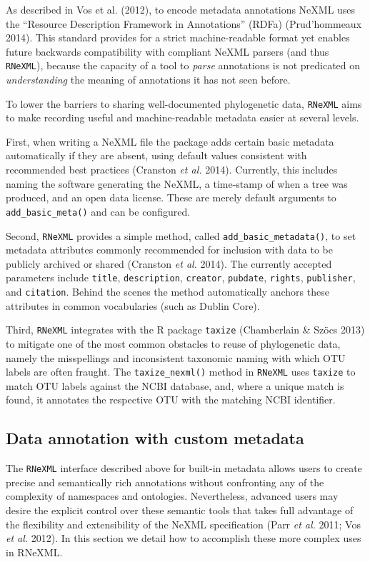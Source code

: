 \documentclass[author-year, review, 11pt]{elsarticle} %
\begin{document}
As described in Vos et al. (2012), to encode metadata annotations NeXML
uses the ``Resource Description Framework in Annotations'' (RDFa)
(Prud'hommeaux 2014). This standard provides for a strict
machine-readable format yet enables future backwards compatibility with
compliant NeXML parsers (and thus \texttt{RNeXML}), because the capacity
of a tool to \emph{parse} annotations is not predicated on
\emph{understanding} the meaning of annotations it has not seen before.

To lower the barriers to sharing well-documented phylogenetic data,
\texttt{RNeXML} aims to make recording useful and machine-readable
metadata easier at several levels.

First, when writing a NeXML file the package adds certain basic metadata
automatically if they are absent, using default values consistent with
recommended best practices (Cranston \emph{et al.} 2014). Currently,
this includes naming the software generating the NeXML, a time-stamp of
when a tree was produced, and an open data license. These are merely
default arguments to \texttt{add\_basic\_meta()} and can be configured.

Second, \texttt{RNeXML} provides a simple method, called
\texttt{add\_basic\_metadata()}, to set metadata attributes commonly
recommended for inclusion with data to be publicly archived or shared
(Cranston \emph{et al.} 2014). The currently accepted parameters include
\texttt{title}, \texttt{description}, \texttt{creator},
\texttt{pubdate}, \texttt{rights}, \texttt{publisher}, and
\texttt{citation}. Behind the scenes the method automatically anchors
these attributes in common vocabularies (such as Dublin Core).

Third, \texttt{RNeXML} integrates with the R package \texttt{taxize}
(Chamberlain \& Sz{ö}cs 2013) to mitigate one of the most common
obstacles to reuse of phylogenetic data, namely the misspellings and
inconsistent taxonomic naming with which OTU labels are often fraught.
The \texttt{taxize\_nexml()} method in \texttt{RNeXML} uses
\texttt{taxize} to match OTU labels against the NCBI database, and,
where a unique match is found, it annotates the respective OTU with the
matching NCBI identifier.

\subsection{Data annotation with custom
metadata}\label{data-annotation-with-custom-metadata}

The \texttt{RNeXML} interface described above for built-in metadata
allows users to create precise and semantically rich annotations without
confronting any of the complexity of namespaces and ontologies.
Nevertheless, advanced users may desire the explicit control over these
semantic tools that takes full advantage of the flexibility and
extensibility of the NeXML specification (Parr \emph{et al.} 2011; Vos
\emph{et al.} 2012). In this section we detail how to accomplish these
more complex uses in RNeXML.
\end{document}
